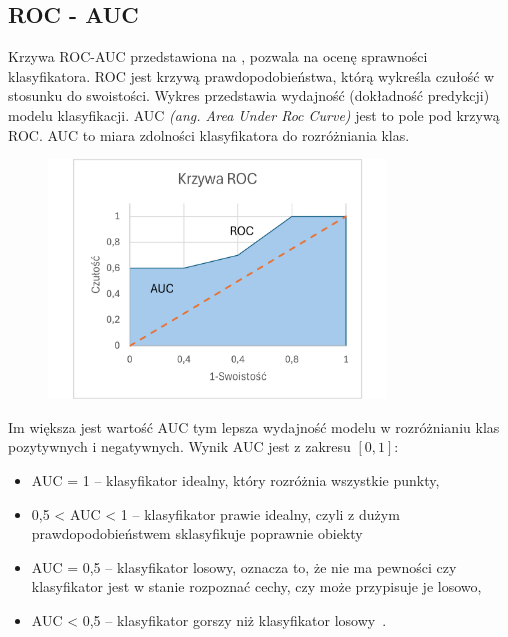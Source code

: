 \subsection{ROC - AUC}
Krzywa ROC-AUC przedstawiona na , pozwala na ocenę sprawności klasyfikatora. ROC jest krzywą prawdopodobieństwa, którą wykreśla czułość w stosunku do swoistości. Wykres przedstawia wydajność (dokładność predykcji) modelu klasyfikacji. AUC \textit{(ang. Area Under Roc Curve)} jest to pole pod krzywą ROC. AUC to miara zdolności klasyfikatora do rozróżniania klas.

\begin{figure}[H]
    \centering
    \includegraphics[width=0.8\textwidth]{images/roc-auc}
    \label{fig:roc-auc}
\end{figure}

Im większa jest wartość AUC tym lepsza wydajność modelu w rozróżnianiu klas pozytywnych i negatywnych. Wynik AUC jest z zakresu $[0, 1]$:
\begin{itemize}
    \item AUC = 1 -- klasyfikator idealny, który rozróżnia wszystkie punkty,
    \item 0,5 < AUC < 1 -- klasyfikator prawie idealny, czyli z dużym prawdopodobieństwem sklasyfikuje poprawnie obiekty
    \item AUC = 0,5 -- klasyfikator losowy, oznacza to, że nie ma pewności czy klasyfikator jest w stanie rozpoznać cechy, czy może przypisuje je losowo,
    \item AUC < 0,5 -- klasyfikator gorszy niż klasyfikator losowy~\cite{Algolytics, Agrawal2024}.
\end{itemize}